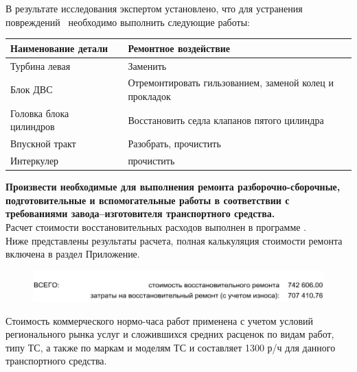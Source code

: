 %
%
%
В результате исследования   экспертом установлено, что для устранения повреждений  \, необходимо  выполнить следующие  работы:
\begin{center}
	\begin{tabulary}{\textwidth}{LCL}
		\hline 
		\textbf{Наименование детали}      &   & \textbf{Ремонтное воздействие}\\
		\hline    
		Турбина левая     &   &    Заменить\\
		Блок ДВС    &   &    Отремонтировать гильзованием, заменой колец и прокладок \\
		Головка блока цилиндров & & Восстановить седла клапанов пятого цилиндра \\
		Впускной тракт & &    Разобрать, прочистить\\
		Интеркулер   & &     прочистить\\
		
		
	\end{tabulary}  
\end{center}
\renewcommand\baselinestretch{1.2}\small\normalsize
%
\textbf{Произвести  необходимые для выполнения  ремонта разборочно-сборочные, подготовительные и вспомогательные работы в соответствии с требованиями завода–изготовителя транспортного средства.}\\
%
Расчет стоимости восстановительных расходов выполнен в программе \auda. \\ Ниже представлены результаты расчета, полная калькуляция стоимости ремонта включена в раздел Приложение.
\begin{figure}[H]
	\centering
	\includegraphics[width=0.8\linewidth]{images/Screenshot_2}
\end{figure}
\medskip
Стоимость коммерческого нормо-часа работ применена  с учетом условий регионального рынка услуг и сложившихся средних расценок по видам работ, типу ТС, а также по маркам и моделям ТС  и   составляет  1300 р/ч для данного транспортного средства. \\
